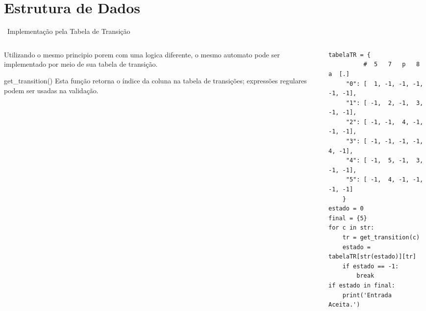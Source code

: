 \documentclass{beamer}
\begin{document}
\section{Estrutura de Dados}
\begin{frame}[fragile]{\raisebox{-0.2\height}{}~Implementação pela Tabela de Transição}

\begin{columns}
\begin{column}{0.45\textwidth}
    \small \justifying Utilizando o mesmo principio porem com uma logica diferente, o mesmo automato pode ser implementado por meio de sua tabela de transição.
    
    \begin{block}{get\_transition()}
    \small Esta função retorna o índice da coluna na tabela de transições; expressões regulares podem ser usadas na validação.
    \end{block}
    
\end{column}
\begin{column}{0.45\textwidth}
\begin{verbatim}
tabelaTR = {
          #  5   7   p   8   a  [.]
     "0": [  1, -1, -1, -1, -1, -1],
     "1": [ -1,  2, -1,  3, -1, -1],
     "2": [ -1, -1,  4, -1, -1, -1],
     "3": [ -1, -1, -1, -1,  4, -1],
     "4": [ -1,  5, -1,  3, -1, -1],
     "5": [ -1,  4, -1, -1, -1, -1]
    }
estado = 0
final = {5}
for c in str:
    tr = get_transition(c)
    estado = tabelaTR[str(estado)][tr]
    if estado == -1:
        break
if estado in final:
    print('Entrada Aceita.')
\end{verbatim}
\end{column}
\end{columns}
\end{frame}
\end{document}

